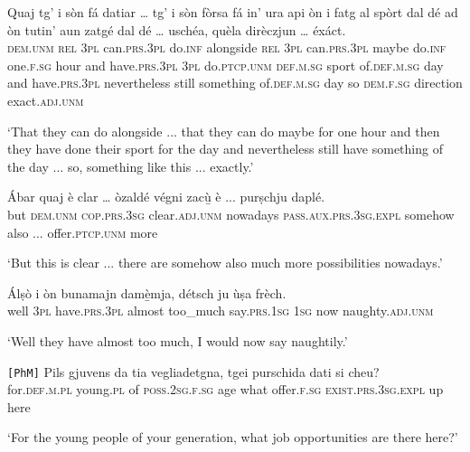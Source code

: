 \begin{linenumbers}
	\gll Quaj tg’ i sòn fá datiar … tg’ i sòn fòrsa fá in’ ura api òn i fatg al spòrt dal dé ad òn tutin’ aun zatgé dal dé … uschéa, quèla dirèczjun … éxáct.\\
	\textsc{dem.unm} \textsc{rel} \textsc{3pl} can.\textsc{prs.3pl} do.\textsc{inf} alongside {} \textsc{rel} \textsc{3pl} can.\textsc{prs.3pl} maybe do.\textsc{inf} one.\textsc{f.sg} hour and have.\textsc{prs.3pl} \textsc{3pl} do.\textsc{ptcp.unm} \textsc{def.m.sg} sport of.\textsc{def.m.sg} day and have.\textsc{prs.3pl} nevertheless still something of.\textsc{def.m.sg} day {} so \textsc{dem.f.sg} direction {} exact.\textsc{adj.unm}\\
\end{linenumbers}
\medskip
\glt `That they can do alongside ... that they can do maybe for one hour and then they have done their sport for the day and nevertheless still have something of the day ... so, something like this ... exactly.'
\medskip

\begin{linenumbers}
	\gll Ábar quaj è clar … òzaldé végni zacù̱ è ...  purṣchju daplé.\\
	but \textsc{dem.unm} \textsc{cop.prs.3sg} clear.\textsc{adj.unm} {} nowadays \textsc{pass.aux.prs.3sg.expl} somehow also ... offer.\textsc{ptcp.unm} more\\
\end{linenumbers}
\medskip
\glt `But this is clear ... there are somehow also much more possibilities nowadays.'
\medskip

\begin{linenumbers}
	\gll  Álṣò i òn bunamajn damè̱mja, détsch ju ùṣa frèch.\footnotemark{}  \\
	well \textsc{3pl} have.\textsc{prs.3pl} almost too\_much say.\textsc{prs.1sg} \textsc{1sg} now naughty.\textsc{adj.unm}\\
\end{linenumbers}
\medskip
\glt `Well they have almost too much, I would now say naughtily.'
\medskip

\begin{linenumbers}
	\gll  \texttt{[PhM]} Pils gjuvens da tia vegliadetgna, tgei purschida dati si cheu?  \\
	{} for.\textsc{def.m.pl} young.\textsc{pl} of \textsc{poss.2sg.f.sg} age what offer.\textsc{f.sg} \textsc{exist.prs.3sg.expl} up here\\
\end{linenumbers}
\medskip
\glt `For the young people of your generation, what job opportunities are there here?'
\medskip

